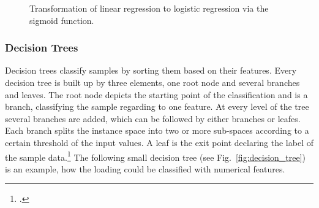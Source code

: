 \begin{figure}[ht]
    \centering
    \caption{Transformation of linear regression to logistic regression via the sigmoid function.}
    \label{fig:LR_plot}
\end{figure}



\subsubsection{Decision Trees}
Decision trees classify samples by sorting them based on their features. Every decision tree
is built up by three elements, one root node and several branches and leaves. The root node
depicts the starting point of the classification and is a branch, classifying the sample
regarding to one feature. At every level of the tree several branches are added, which can be followed
by either branches or leafes. Each branch splits the instance space into two or more sub-spaces
according to a certain threshold of the input values. A leaf is the exit point declaring
the label of the sample data.\footcite[cf.][p.5-6]{nasteski_overview_2017}
The following small decision tree (see Fig.~\ref{fig:decision_tree}) is an example,
how the loading could be classified with numerical features.

